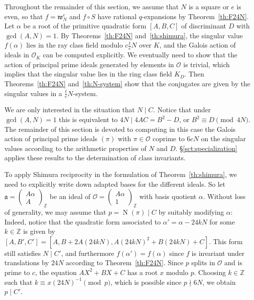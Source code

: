 \documentclass[12pt,twoside,leqno]{article}
\numberwithin{equation}{section}
\newcommand{\w}{\mathfrak w}
\newcommand{\af}{\mathfrak a}
\newcommand{\OO}{\mathcal O}
\newcommand{\OK}{\mathcal{O}_{\K}}
\newcommand{\Z}{\mathbb Z}
\newcommand{\K}{K}
\newcommand{\Norm}{\operatorname {N}}
\begin{document}
Throughout the remainder of this section, we assume that $N$ is a
square or $e$ is even, so that $f = \w_N^e$ and $f \circ S$ have
rational $q$-expansions by Theorem~\ref {th:F24N}. Let $\alpha$ be
a root of the primitive quadratic form $[A, B, C]$ of discriminant
$D$ with $\gcd (A, N) = 1$.
By Theorems~\ref {th:F24N} and~\ref {th:shimura}, the singular
value $f (\alpha)$ lies in the ray class field modulo
$c \frac {t}{e} N$ over $\K$, and the Galois action of ideals
in $\OK$ can be computed explicitly. We eventually need to show that
the action of principal prime ideals generated by elements in
$\OO$ is trivial, which implies that the singular value lies
in the ring class field $\K_D$. Then Theorems~\ref {th:F24N}
and~\ref{th:N-system} show that the conjugates
are given by the singular values in a $\frac {t}{e}N$-system.

We are only interested in the situation that $N \mid C$. Notice
that under $\gcd (A, N) = 1$ this is equivalent to
$4 N \mid 4 A C = B^2 - D$, or $B^2 \equiv D \pmod {4 N}$.
The remainder of this section is devoted to computing in
this case
the Galois action of principal prime ideals $(\pi)$ with
$\pi \in \OO$ coprime to $6 c N$ on the
singular values according to the arithmetic properties of $N$ and
$D$. \S\ref {sct:specialization} applies
these results to the determination of class invariants.

To apply Shimura reciprocity in the formulation of
Theorem~\ref {th:shimura}, we need to explicitly write down adapted
bases for the different ideals. So let
$\af = \begin {pmatrix} A \alpha \\ A \end {pmatrix}_\Z$ be an ideal of
$\OO = \begin {pmatrix} A \alpha \\ 1 \end {pmatrix}_\Z$ with basis quotient
$\alpha$.
Without loss of generality, we may assume that $p = \Norm (\pi) \mid C$
by suitably modifying
$\alpha$: Indeed, notice that the quadratic form associated to
$\alpha' = \alpha - 24 k N$ for some $k \in \Z$ is given by
$[A, B', C'] = [A, B + 2 A (24 k N), A (24 k N)^2 + B (24 k N) + C]$.
This form still satisfies $N \mid C'$, and furthermore
$f (\alpha') = f (\alpha)$ since $f$ is invariant under translations
by $24 N$ according to Theorem~\ref {th:F24N}.
Since $p$ splits in $\OO$ and is prime to $c$, the equation $A X^2 + B X + C$
has a root $x$ modulo $p$. Choosing $k \in \Z$ such that
$k \equiv x (24 N)^{-1} \pmod p$, which is
possible since $p \nmid 6 N$, we obtain $p \mid C'$.
\end{document}
